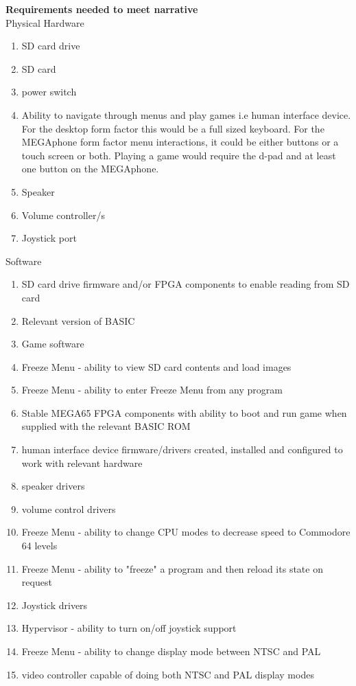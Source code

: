 \textbf{Requirements needed to meet narrative}\\
Physical Hardware
\begin{enumerate}
\item SD card drive
\item SD card
\item power switch
\item Ability to navigate through menus and play games i.e human interface device. For the desktop form factor this would be a full sized keyboard. For the MEGAphone form factor menu interactions, it could be either buttons or a touch screen or both. Playing a game would require the d-pad and at least one button on the MEGAphone.
\item Speaker
\item Volume controller/s
\item Joystick port
\end{enumerate}

Software\\
\begin{enumerate}
\item SD card drive firmware and/or FPGA components to enable reading from SD card
\item Relevant version of BASIC 
\item Game software
\item Freeze Menu - ability to view SD card contents and load images
\item Freeze Menu - ability to enter Freeze Menu from any program
\item Stable MEGA65 FPGA components with ability to boot and run game when supplied with the relevant BASIC ROM
\item human interface device firmware/drivers created, installed and configured to work with relevant hardware
\item speaker drivers
\item volume control drivers 
\item Freeze Menu - ability to change CPU modes to decrease speed to Commodore 64 levels
\item Freeze Menu - ability to "freeze" a program and then reload its state on request
\item Joystick drivers
\item Hypervisor - ability to turn on/off joystick support
\item Freeze Menu - ability to change display mode between NTSC and PAL
\item video controller capable of doing both NTSC and PAL display modes
\end{enumerate}

